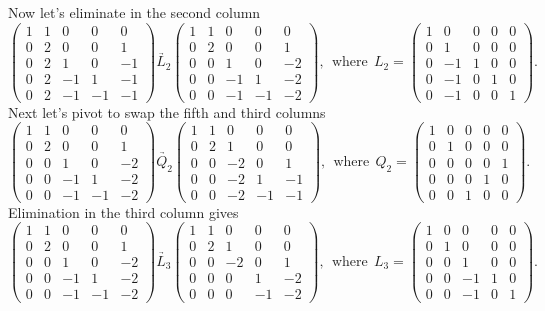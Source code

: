 Now let's eliminate in the second column
\[
    \begin{pmatrix}1&1&0&0&0\\ 0&2&0&0&1\\ 0&2&1&0&-1\\ 0&2&-1&1&-1\\ 0&2&-1&-1&-1\end{pmatrix} \underrightarrow{L_2} \begin{pmatrix}1&1&0&0&0\\ 0&2&0&0&1\\ 0&0&1&0&-2\\ 0&0&-1&1&-2\\ 0&0&-1&-1&-2\end{pmatrix}, ~~ \text{where}~~ L_2 = \begin{pmatrix}1&0&0&0&0\\ 0&1&0&0&0\\ 0&-1&1&0&0\\ 0&-1&0&1&0\\ 0&-1&0&0&1\end{pmatrix}.
\]
Next let's pivot to swap the fifth and third columns
\[ 
    \begin{pmatrix}1&1&0&0&0\\ 0&2&0&0&1\\ 0&0&1&0&-2\\ 0&0&-1&1&-2\\ 0&0&-1&-1&-2\end{pmatrix} \underrightarrow{Q_2} \begin{pmatrix}1&1&0&0&0\\ 0&2&1&0&0\\ 0&0&-2&0&1\\ 0&0&-2&1&-1\\ 0&0&-2&-1&-1\end{pmatrix}, ~~ \text{where}~~ Q_2 = \begin{pmatrix}1&0&0&0&0\\ 0&1&0&0&0\\ 0&0&0&0&1\\ 0&0&0&1&0\\ 0&0&1&0&0\end{pmatrix}.
\]
Elimination in the third column gives
\[ 
    \begin{pmatrix}1&1&0&0&0\\ 0&2&0&0&1\\ 0&0&1&0&-2\\ 0&0&-1&1&-2\\ 0&0&-1&-1&-2\end{pmatrix} \underrightarrow{L_3} \begin{pmatrix}1&1&0&0&0\\ 0&2&1&0&0\\ 0&0&-2&0&1\\ 0&0&0&1&-2\\ 0&0&0&-1&-2\end{pmatrix}, ~~ \text{where}~~ L_3 = \begin{pmatrix}1&0&0&0&0\\ 0&1&0&0&0\\ 0&0&1&0&0\\ 0&0&-1&1&0\\ 0&0&-1&0&1\end{pmatrix}.
\]
